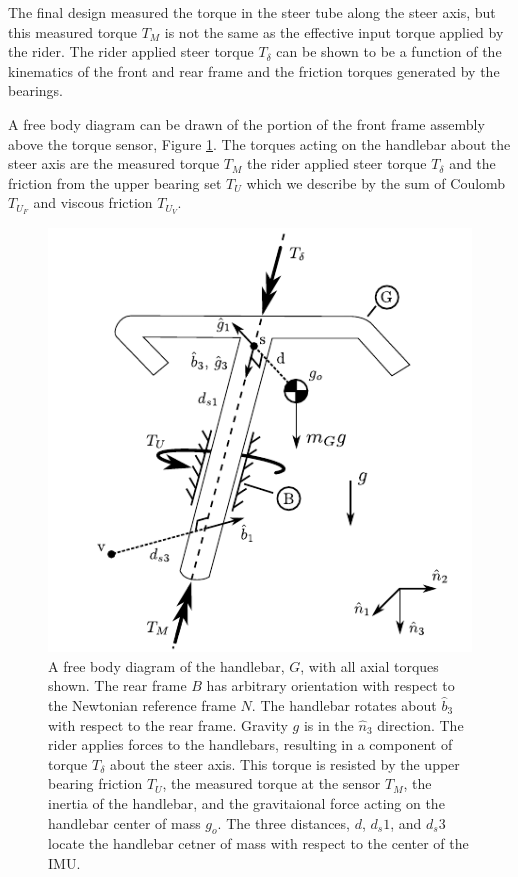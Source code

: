 \documentclass[a4paper]{article}
\begin{document}
The final design measured the torque in the steer tube along the steer axis,
but this measured torque $T_M$ is not the same as the effective input torque
applied by the rider. The rider applied steer torque $T_\delta$ can be shown
to be a function of the kinematics of the front and rear frame and the friction
torques generated by the bearings.

A free body diagram can be drawn of the portion of the front frame assembly
above the torque sensor, Figure \ref{fig:handlebar-free-body}. The torques
acting on the handlebar about the steer axis are the measured torque $T_M$
the rider applied steer torque $T_\delta$ and the friction from the upper
bearing set $T_U$ which we describe by the sum of Coulomb $T_{U_F}$ and
viscous friction $T_{U_V}$.

\begin{figure}
  \centering
  \includegraphics{figures/handlebar-free-body.pdf}
  \caption{A free body diagram of the handlebar, $G$, with all axial torques
    shown. The rear frame $B$ has arbitrary orientation with respect to the Newtonian
    reference frame $N$. The handlebar rotates
    about $\hat{b}_3$ with respect to the rear frame. Gravity $g$ is in the
    $\hat{n}_3$ direction. The rider applies forces to the handlebars, resulting in
    a component of torque $T_\delta$ about the steer axis. This torque is
    resisted by the upper bearing friction $T_U$, the measured torque at the
    sensor $T_M$, the inertia of the handlebar, and the gravitaional force
    acting on the handlebar center of mass $g_o$. The three distances, $d$,
    $d_s1$, and $d_s3$ locate the handlebar cetner of mass with respect to the
    center of the IMU.}
  \label{fig:handlebar-free-body}
\end{figure}
\end{document}
